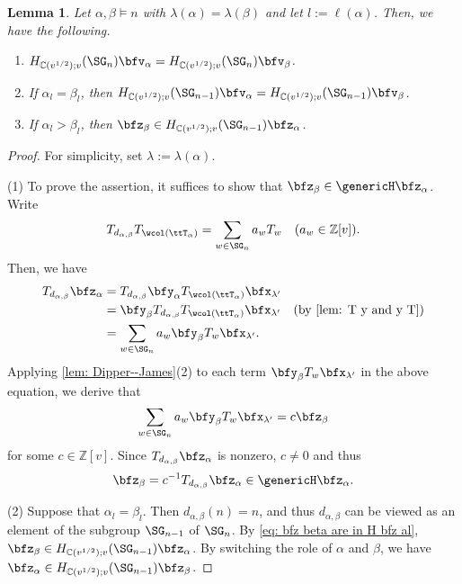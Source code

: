 \documentclass[12pt, reqno]{amsart}
\theoremstyle{plain}
\newtheorem{lemma}[lemma]{Lemma}
\theoremstyle{definition}
\numberwithin{equation}{section}
\numberwithin{figure}{section}
\numberwithin{table}{section}
\def\Z{\mathbb Z}
\def\C{\mathbb C}
\begin{document}
\begin{lemma}\label{lem: basic step for inclusion}
Let $\alpha, \beta \models n$ with $\lambda(\alpha) = \lambda(\beta)$ and let $l := \ell(\alpha)$.
Then, we have the following.
\begin{enumerate}[label = {\rm (\arabic*)}]
    \item $H_{\C( v^{1/2});v}(\SG_n) \bfv_\alpha = H_{\C( v^{1/2});v}(\SG_n) \bfv_\beta$.
    \item If $\alpha_l = \beta_l$, then $ H_{\C( v^{1/2});v}(\SG_{n-1}) \bfv_\alpha = H_{\C( v^{1/2});v}(\SG_{n-1}) \bfv_\beta$.
    \item If $\alpha_l >\beta_l$, then 
    $\bfz_\beta \in H_{\C(v^{1/2});v}(\SG_{n-1}) \bfz_\alpha$.
\end{enumerate}
\end{lemma}
\begin{proof}
For simplicity, set $\lambda := \lambda(\alpha)$.


(1) To prove the assertion, it suffices to show that $\bfz_{\beta} \in \genericH\bfz_{\alpha}$.
Write 
\[
T_{d_{\alpha, \beta}} T_{\wcol(\ttT_{\alpha})} = \sum_{w \in \SG_n} a_w T_w \quad(a_w \in \Z[v]).
\]
Then, 
we have 
\begin{align*}
T_{d_{\alpha, \beta}} \bfz_\alpha &= 
T_{d_{\alpha, \beta}} \bfy_{\alpha} T_{\wcol(\ttT_\alpha)} \bfx_{\lambda'} \\
&= \bfy_{\beta} T_{d_{\alpha, \beta}} T_{\wcol(\ttT_\alpha)} \bfx_{\lambda'} \quad(\text{by \cref{lem: T y and y T}})   \\
&= \sum_{w \in \SG_n} a_w \bfy_{\beta} T_{w} \bfx_{\lambda'}.
\end{align*}
Applying \cref{lem: Dipper--James}(2) to each term
$\bfy_\beta T_w\bfx_{\lambda'}$ in the above equation, we derive that 
\[
\sum_{w \in \SG_n} a_w \bfy_{\beta} T_{w} \bfx_{\lambda'} = c \bfz_{\beta}
\]
for some $c \in \Z[v]$.
Since $T_{d_{\alpha, \beta}} \bfz_{\alpha}$ is nonzero,  $c \neq 0$ and thus
\begin{align}\label{eq: bfz beta are in H bfz al}
\bfz_\beta = c^{-1} T_{d_{\alpha,\beta}} \bfz_\alpha \in \genericH \bfz_\alpha.
\end{align}



(2) Suppose that $\alpha_l = \beta_l$.
Then $d_{\alpha, \beta}(n) = n$, and thus $d_{\alpha, \beta}$ can be viewed as an element of the subgroup $\SG_{n-1}$ of $\SG_n$.
By \cref{eq: bfz beta are in H bfz al}, $\bfz_{\beta} \in H_{\C(v^{1/2});v}(\SG_{n-1}) \bfz_\alpha$.
By switching the role of $\alpha$ and $\beta$, we have $\bfz_{\alpha} \in H_{\C(v^{1/2});v}(\SG_{n-1}) \bfz_\beta$.



\end{proof}
\end{document}
